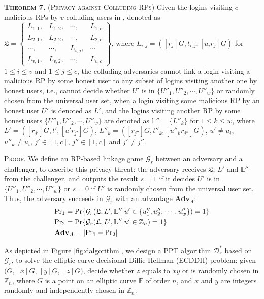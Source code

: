 \vspace{2mm}
\noindent \textsc{\textbf{Theorem 7.} (Privacy against Colluding RPs)} { Given
    the logins visiting $c$ malicious RPs by $v$ colluding users in \usso, denoted as
 $\mathfrak{L}=\left \{ \begin{matrix}
L_{1,1},&L_{1,2},&\cdots,&L_{1,c}\\
L_{2,1},& L_{2,2},&\cdots,&L_{2,c}\\
\cdots,&\cdots,&L_{i,j},&\cdots\\
L_{v,1},&L_{v,2},&\cdots,&L_{v,c}
\end{matrix}\right\}$, where
 $L_{i, j}=([r_j]G, t_{i,j}, [u_ir_j]G)$ for $1 \le i \le v$ and $1 \le j \le c$,
the colluding adversaries cannot link a login visiting a malicious RP by some honest user
    to any subset of logins visiting another one by honest users,
  i.e., cannot decide whether $U'$ is in $\{{U''_1}, {U''_2}, \cdots, {U''_w}\}$ or randomly chosen from the universal user set,
    when a login visiting some malicious RP by an honest user $U'$ is denoted as $L'$,
     and the logins visiting another RP by some honest users $\{{U''_1}, {U''_2}, \cdots, {U''_w}\}$ are denoted as $\mathbb{L}'' = \{L''_k\}$ for $1 \leq k \leq w$,
     where $L' = ([r_{j'}]G, t', [u'r_{j'}]G)$, $L''_k = ([r_{j''}]G, t''_k, [u''_kr_{j''}]G)$, $u' \neq u_i$, $u''_k \neq u_i$,
     $j' \in [1,c]$, $j'' \in [1,c]$ and $j' \neq j''$.}

\vspace{0.85mm}
\noindent\textsc{Proof.}
We define an RP-based linkage game $\mathcal{G}_r$ between an adversary and a challenger,
    to describe this privacy threat:
 the adversary receives $\mathfrak{L}$, $L'$ and $\mathbb{L}''$ from the challenger,
 and outputs the result $s = 1$ if it decides $U'$ is in $\{{U''_1}, {U''_2}, \cdots, {U''_w}\}$
  or $s=0$ if $U'$ is randomly chosen from the universal user set.
Thus, the adversary succeeds in $\mathcal{G}_r$ with an advantage $\mathbf{Adv}_{A}$:
\begin{align*}
&{\rm Pr}_1={\rm Pr}\{\mathcal{G}_r(\mathfrak{L}, L', \mathbb{L}'' | u' \in \{{u''_1}, {u''_2}, \cdots, {u''_w}\})=1\} \\
&{\rm Pr}_2={\rm Pr}\{\mathcal{G}_r(\mathfrak{L}, L', \mathbb{L}'' | u' \in \mathbb{Z}_n)=1\}\\
&{\mathbf{Adv}}_{A}=|{\rm Pr}_1-{\rm Pr}_2|
\end{align*}

As depicted in Figure \ref{fig:dalgorithm},
    we design a PPT algorithm $\mathcal{D}^*_r$ based on $\mathcal{G}_r$,
     to solve the elliptic curve decisional Diffie-Hellman (ECDDH) problem:
 given $(G, [x]G$, $[y]G$, $[z]G)$, decide whether $z$ equals to $xy$ or is randomly chosen in $\mathbb{Z}_n$,
    where $G$ is a point on an elliptic curve $\mathbb{E}$ of order $n$, and $x$ and $y$ are integers randomly and independently chosen in $\mathbb{Z}_n$.


